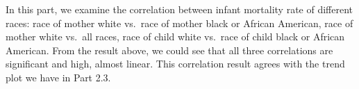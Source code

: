\documentclass[]{article}
\begin{document}
In this part, we examine the correlation between infant mortality rate
of different races: race of mother white vs.~race of mother black or
African American, race of mother white vs.~all races, race of child
white vs.~race of child black or African American. From the result
above, we could see that all three correlations are significant and
high, almost linear. This correlation result agrees with the trend plot
we have in Part 2.3.
\end{document}
